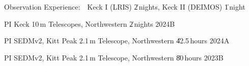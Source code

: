 \begin{cvpubs}

\end{cvpubs}





\begin{cventries}

\cvpub
{ %
{Observation Experience:}\ \ Keck I (LRIS) \| 2\,nights, Keck II (DEIMOS) \| 1\,night
}

\cvsimpentry
    {PI}
    {Keck 10\,m Telescopes, Northwestern \| 2\,nights}
    {2024B}
    {}

\cvsimpentry
	{PI}
	{SEDMv2, Kitt Peak 2.1\,m Telescope, Northwestern \| 42.5\,hours}
	{2024A}
	{} 

\cvsimpentry
	{PI}
	{SEDMv2, Kitt Peak 2.1\,m Telescope, Northwestern \| 80\,hours}
	{2023B}
	{}





\end{cventries}